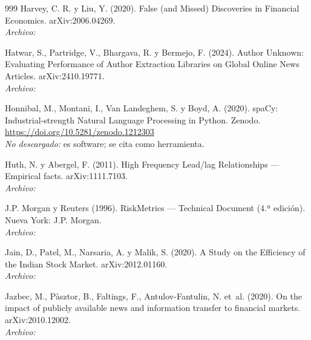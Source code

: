 \begin{thebibliography}{999}
Harvey, C. R. y Liu, Y. (2020). False (and Missed) Discoveries in Financial Economics. arXiv:2006.04269.
\\\textit{Archivo:} 

Hatwar, S., Partridge, V., Bhargava, R. y Bermejo, F. (2024). Author Unknown: Evaluating Performance of Author Extraction Libraries on Global Online News Articles. arXiv:2410.19771.
\\\textit{Archivo:} 

Honnibal, M., Montani, I., Van Landeghem, S. y Boyd, A. (2020). {spaCy}: Industrial-strength Natural Language Processing in Python. Zenodo. \url{https://doi.org/10.5281/zenodo.1212303}
\\\textit{No descargado:} es software; se cita como herramienta.

Huth, N. y Abergel, F. (2011). High Frequency Lead/lag Relationships — Empirical facts. arXiv:1111.7103.
\\\textit{Archivo:} 

J.P. Morgan y Reuters (1996). RiskMetrics — Technical Document (4.ª edición). Nueva York: J.P. Morgan.
\\\textit{Archivo:} 

Jain, D., Patel, M., Narsaria, A. y Malik, S. (2020). A Study on the Efficiency of the Indian Stock Market. arXiv:2012.01160.
\\\textit{Archivo:} 

Jazbec, M., P{\`a}sztor, B., Faltings, F., Antulov-Fantulin, N. et~al. (2020). On the impact of publicly available news and information transfer to financial markets. arXiv:2010.12002.
\\\textit{Archivo:} 


\end{thebibliography}
